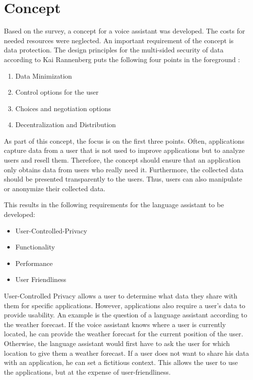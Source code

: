 \section{Concept}\label{sec:konzept}
Based on the survey, a concept for a voice assistant was developed. The costs for needed resources were neglected. An important requirement of the concept is data protection. The design principles for the multi-sided security of data according to Kai Rannenberg puts the following four points in the foreground \cite{kairannenberg}:

\begin{enumerate}
	\item Data Minimization
	\item Control options for the user 
	\item Choices and negotiation options 
	\item Decentralization and Distribution
\end{enumerate} 

As part of this concept, the focus is on the first three points. Often, applications capture data from a user that is not used to improve applications but to analyze users and resell them. Therefore, the concept should ensure that an application only obtains data from users who really need it. Furthermore, the collected data should be presented transparently to the users. Thus, users can also manipulate or anonymize their collected data.

This results in the following requirements for the language assistant to be developed:
\begin{itemize}
	\item User-Controlled-Privacy
	\item Functionality
	\item Performance
	\item User Friendliness	
\end{itemize}

User-Controlled Privacy allows a user to determine what data they share with them for specific applications. However, applications also require a user's data to provide usability. An example is the question of a language assistant according to the weather forecast. If the voice assistant knows where a user is currently located, he can provide the weather forecast for the current position of the user. Otherwise, the language assistant would first have to ask the user for which location to give them a weather forecast. If a user does not want to share his data with an application, he can set a fictitious context. This allows the user to use the applications, but at the expense of user-friendliness.

